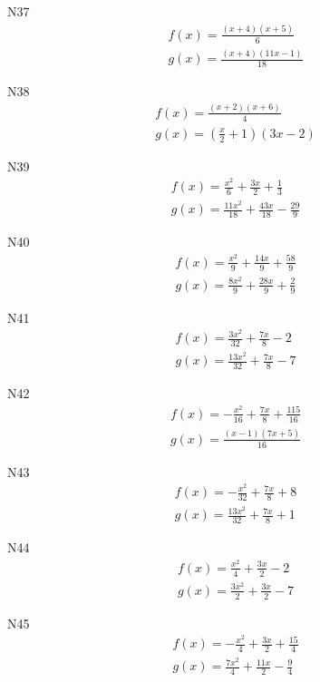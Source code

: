 \documentclass[11pt]{report}
\begin{document}
N37
\begin{align*}
 f(x) = \frac{\left(x + 4\right) \left(x + 5\right)}{6}\\
 g(x) = \frac{\left(x + 4\right) \left(11 x - 1\right)}{18}
\end{align*}

N38
\begin{align*}
 f(x) = \frac{\left(x + 2\right) \left(x + 6\right)}{4}\\
 g(x) = \left(\frac{x}{2} + 1\right) \left(3 x - 2\right)
\end{align*}

N39
\begin{align*}
 f(x) = \frac{x^{2}}{6} + \frac{3 x}{2} + \frac{1}{3}\\
 g(x) = \frac{11 x^{2}}{18} + \frac{43 x}{18} - \frac{29}{9}
\end{align*}

N40
\begin{align*}
 f(x) = \frac{x^{2}}{9} + \frac{14 x}{9} + \frac{58}{9}\\
 g(x) = \frac{8 x^{2}}{9} + \frac{28 x}{9} + \frac{2}{9}
\end{align*}

N41
\begin{align*}
 f(x) = \frac{3 x^{2}}{32} + \frac{7 x}{8} - 2\\
 g(x) = \frac{13 x^{2}}{32} + \frac{7 x}{8} - 7
\end{align*}

N42
\begin{align*}
 f(x) = - \frac{x^{2}}{16} + \frac{7 x}{8} + \frac{115}{16}\\
 g(x) = \frac{\left(x - 1\right) \left(7 x + 5\right)}{16}
\end{align*}

N43
\begin{align*}
 f(x) = - \frac{x^{2}}{32} + \frac{7 x}{8} + 8\\
 g(x) = \frac{13 x^{2}}{32} + \frac{7 x}{8} + 1
\end{align*}

N44
\begin{align*}
 f(x) = \frac{x^{2}}{4} + \frac{3 x}{2} - 2\\
 g(x) = \frac{3 x^{2}}{2} + \frac{3 x}{2} - 7
\end{align*}

N45
\begin{align*}
 f(x) = - \frac{x^{2}}{4} + \frac{3 x}{2} + \frac{15}{4}\\
 g(x) = \frac{7 x^{2}}{4} + \frac{11 x}{2} - \frac{9}{4}
\end{align*}
\end{document}
